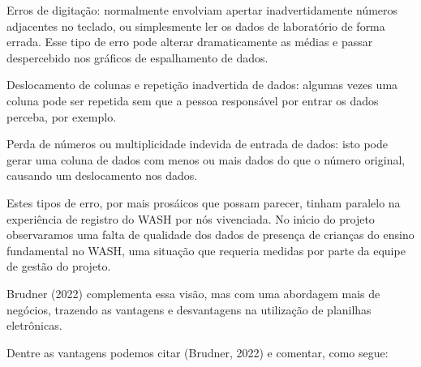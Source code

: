 \documentclass[
12pt,		%
openright,	%
twoside,  %
a4paper,			%
chapter=TITLE,		%
english,			%
french,				%
spanish,			%
brazil				%
]{USPSC-classe/USPSC}
\begin{document}
\begin{alineas}
\item Erros de digita\c{c}\~ao: normalmente envolviam apertar inadvertidamente n\'umeros adjacentes no teclado, ou simplesmente ler os dados de laborat\'orio de forma errada. Esse tipo de erro pode alterar dramaticamente as m\'edias e passar despercebido nos gr\'aficos de espalhamento de dados.
\item Deslocamento de colunas e repeti\c{c}\~ao inadvertida de dados: algumas vezes uma coluna pode ser repetida sem que a pessoa respons\'avel por entrar os dados perceba, por exemplo.
\item Perda de n\'umeros ou multiplicidade indevida de entrada de dados: isto pode gerar uma coluna de dados com menos ou mais dados do que o n\'umero original, causando um deslocamento nos dados.
\end{alineas}

Estes tipos de erro, por mais pros\'aicos que possam parecer, tinham paralelo na experi\^encia de registro do WASH por n\'os vivenciada. No in\'{\i}cio do projeto observaramos uma falta de qualidade dos dados de presen\c{c}a de crian\c{c}as do ensino fundamental no WASH, uma situa\c{c}\~ao que requeria medidas por parte da equipe de gest\~ao do projeto.




 Brudner (2022) complementa essa vis\~ao, mas com uma abordagem mais de neg\'ocios, trazendo as vantagens e desvantagens na utiliza\c{c}\~ao de planilhas eletr\^onicas.




Dentre as vantagens podemos citar (Brudner, 2022) e comentar, como segue:
\end{document}
